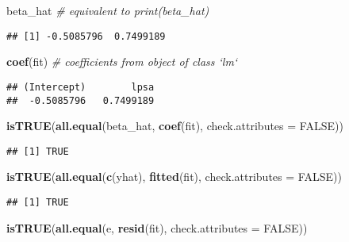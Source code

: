 \documentclass[]{book}
\newenvironment{Shaded}{\begin{snugshade}}{\end{snugshade}}
\newcommand{\CommentTok}[1]{\textcolor[rgb]{0.56,0.35,0.01}{\textit{#1}}}
\newcommand{\DataTypeTok}[1]{\textcolor[rgb]{0.13,0.29,0.53}{#1}}
\newcommand{\KeywordTok}[1]{\textcolor[rgb]{0.13,0.29,0.53}{\textbf{#1}}}
\newcommand{\NormalTok}[1]{#1}
\newcommand{\OtherTok}[1]{\textcolor[rgb]{0.56,0.35,0.01}{#1}}
\theoremstyle{definition}
\theoremstyle{definition}
\theoremstyle{definition}
\theoremstyle{remark}
\begin{document}
\begin{Shaded}
\begin{Highlighting}[]
\NormalTok{beta_hat }\CommentTok{# equivalent to print(beta_hat)}
\end{Highlighting}
\end{Shaded}

\begin{verbatim}
## [1] -0.5085796  0.7499189
\end{verbatim}

\begin{Shaded}
\begin{Highlighting}[]
\KeywordTok{coef}\NormalTok{(fit) }\CommentTok{# coefficients from object of class `lm`}
\end{Highlighting}
\end{Shaded}

\begin{verbatim}
## (Intercept)        lpsa 
##  -0.5085796   0.7499189
\end{verbatim}

\begin{Shaded}
\begin{Highlighting}[]
\KeywordTok{isTRUE}\NormalTok{(}\KeywordTok{all.equal}\NormalTok{(beta_hat, }\KeywordTok{coef}\NormalTok{(fit), }\DataTypeTok{check.attributes =} \OtherTok{FALSE}\NormalTok{))}
\end{Highlighting}
\end{Shaded}

\begin{verbatim}
## [1] TRUE
\end{verbatim}

\begin{Shaded}
\begin{Highlighting}[]
\KeywordTok{isTRUE}\NormalTok{(}\KeywordTok{all.equal}\NormalTok{(}\KeywordTok{c}\NormalTok{(yhat), }\KeywordTok{fitted}\NormalTok{(fit), }\DataTypeTok{check.attributes =} \OtherTok{FALSE}\NormalTok{))}
\end{Highlighting}
\end{Shaded}

\begin{verbatim}
## [1] TRUE
\end{verbatim}

\begin{Shaded}
\begin{Highlighting}[]
\KeywordTok{isTRUE}\NormalTok{(}\KeywordTok{all.equal}\NormalTok{(e, }\KeywordTok{resid}\NormalTok{(fit), }\DataTypeTok{check.attributes =} \OtherTok{FALSE}\NormalTok{))}
\end{Highlighting}
\end{Shaded}
\end{document}
